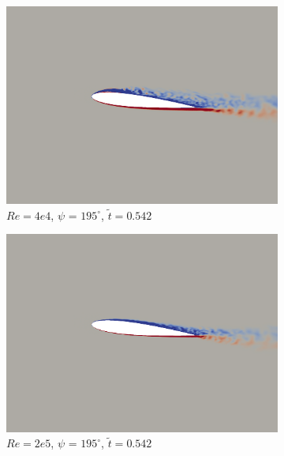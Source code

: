 \begin{figure}[H]
	\centering
	
	\begin{subfigure}[b]{0.32\textwidth}
		\centering
		\includegraphics[width=1\textwidth]{figures/Vorticity_plots/Re_40k_1pt0/phase_195.png}
		\caption{$Re=4e4$, $\psi$ = $195^\circ$, $\tilde{t}=0.542$}
		\label{fig:Re_40k_1pt0_phi195}
	\end{subfigure}
	\begin{subfigure}[b]{0.32\textwidth}
		\centering
		\includegraphics[width=1\textwidth]{figures/Vorticity_plots/Re_200k_1pt0/phase_195.png}
		\caption{$Re=2e5$, $\psi$ = $195^\circ$, $\tilde{t}=0.542$}
		\label{fig:Re_200k_1pt0_phi195}
	\end{subfigure}
	\begin{subfigure}[b]{0.32\textwidth}

\end{subfigure}
\end{figure}
